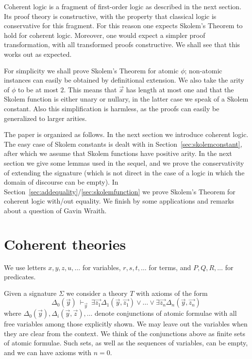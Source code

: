 \documentclass{fundam}
\begin{document}
Coherent logic is a fragment of first-order logic as described in the next section.
Its proof theory is constructive, with the property that classical logic is conservative
for this fragment. For this reason one expects Skolem's Theorem to hold
for coherent logic. Moreover, one would expect a simpler proof transformation,
with all transformed proofs constructive. We shall see that this works out
as expected.

For simplicity we shall prove Skolem's Theorem for atomic $\phi$;
non-atomic instances can easily be obtained by definitional extension.
We also take the arity of $\phi$ to be at most $2$. This means
that $\vec{x}$ has length at most one and that the Skolem function is
either unary or nullary, in the latter case we speak of a Skolem constant.
Also this simplification is harmless, as the proofs can easily be
generalized to larger arities.

The paper is organized as follows. In the next section we introduce coherent logic.
The easy case of Skolem constants is dealt with in Section~\ref{sec:skolemconstant},
after which we assume that Skolem functions have positive arity. In the next
section we give some lemmas used in the sequel, and we prove the
conservativity of extending the signature (which is not direct in the case
of a logic in which the domain of discourse can be empty). 
In Section~\ref{sec:addequality}/\ref{sec:skolemfunction} 
we prove Skolem's Theorem for coherent logic with/out equality.
We finish by some applications and remarks about a question of Gavin Wraith. 

\section{Coherent theories}\label{coherent}
 
We use letters $x,y,z,u,\dots$ for variables,
$r,s,t,\dots$ for terms, and $P,Q,R,\ldots$ for predicates.

\medskip

Given a signature $\Sigma$ we consider a theory $T$ with axioms of the form
$$
\Delta_0(\vec{y})~\vdash_{\vec{y}}~
\exists \vec{z_1}\Delta_1(\vec{y},\vec{z_1})\vee\dots\vee\exists \vec{z_n}\Delta_n(\vec{y},\vec{z_n})
$$
where $\Delta_0(\vec{y}),\Delta_i(\vec{y},\vec{z}), \dots$
denote conjunctions of atomic formulae
with all free variables among those explicitly shown. We may leave out the variables
when they are clear from the context.
We think of the conjunctions above as finite sets of atomic formulae.
Such sets, as well as the sequences of variables, can be empty, 
and we can have axioms with $n=0$. 
\end{document}
